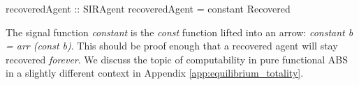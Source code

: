 \begin{HaskellCode}
recoveredAgent :: SIRAgent
recoveredAgent = constant Recovered
\end{HaskellCode}

The signal function \textit{constant} is the \textit{const} function lifted into an arrow: \textit{constant b = arr (const b)}. This should be proof enough that a recovered agent will stay recovered \textit{forever}. We discuss the topic of computability in pure functional ABS in a slightly different context in Appendix \ref{app:equilibrium_totality}.